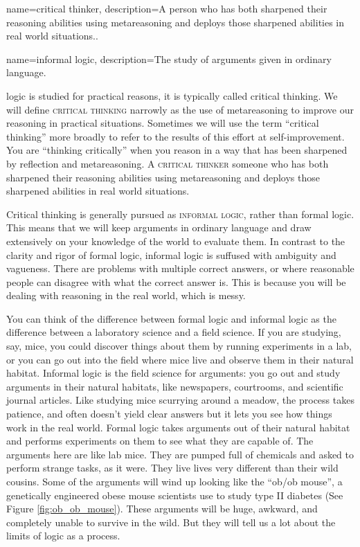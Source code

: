 {
name=critical thinker,
description={A person who has both sharpened their reasoning abilities using metareasoning and deploys those sharpened abilities in real world situations..}
}

{
name=informal logic,
description={The study of arguments given in ordinary language.}
}


 logic is studied for practical reasons, it is typically called critical thinking. We will define \textsc{\gls{critical thinking}}\label{def:Critical_Thinking}  narrowly as the use of metareasoning to improve our reasoning in practical situations.  Sometimes we will use the term ``critical thinking'' more broadly to refer to the results of this effort at self-improvement.  You are ``thinking critically'' when you reason in a way that has been sharpened by reflection and metareasoning. A \textsc{\gls{critical thinker}}\label{def:critical_thinker} someone who has both sharpened their reasoning abilities using metareasoning and deploys those sharpened abilities in real world situations.

Critical thinking is generally pursued as \textsc{\gls{informal logic}}, rather than formal logic. This means that we will keep arguments in ordinary language and draw extensively on your knowledge of the world to evaluate them. In contrast to the clarity and rigor of formal logic, informal logic is suffused with ambiguity and vagueness. There are problems  with multiple correct answers, or where reasonable people can disagree with what the correct answer is. This is because you will be dealing with reasoning in the real world, which is messy. \label{messiness_warning} \label{ver_var} 
  

You can think of the difference between formal logic and informal logic as the difference between a laboratory science and a field science. \label{lab_vs._field_science} If you are studying, say, mice, you could discover things about them by running experiments in a lab, or you can go out into the field where mice live and observe them in their natural habitat.  Informal logic is the field science for arguments: you go out and study arguments in their natural habitats, like newspapers, courtrooms, and scientific journal articles. Like studying mice scurrying around a meadow, the process takes patience, and often doesn't yield clear answers but it lets you see how things work in the real world. Formal logic takes arguments out of their natural habitat and performs experiments on them to see what they are capable of. The arguments here are like lab mice. They are pumped full of chemicals and asked to perform strange tasks, as it were. They live lives very different than their wild cousins. Some of the arguments will wind up looking like the ``ob/ob mouse'', a genetically engineered obese mouse scientists use to study type II diabetes (See Figure \ref{fig:ob_ob_mouse}). These arguments will be huge, awkward, and completely unable to survive in the wild. But they will tell us a lot about the limits of logic as a process.


